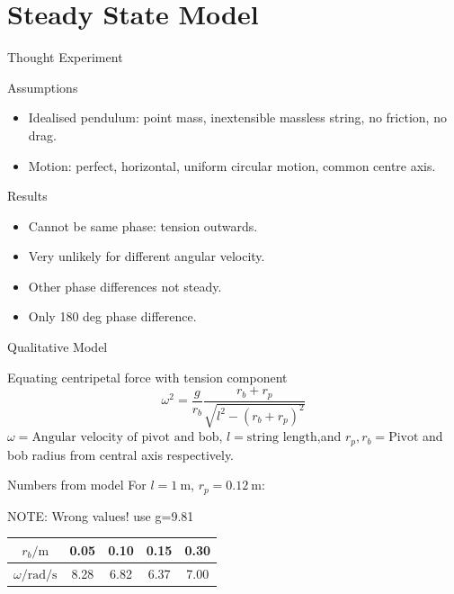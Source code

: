 \documentclass[10pt, compress]{beamer}
\begin{document}
\section{Steady State Model}

\begin{frame}{Thought Experiment}
    \begin{block}{Assumptions}
    \begin{itemize}
        \item Idealised pendulum: point mass, inextensible massless string, no friction, no drag.
        \item Motion: perfect, horizontal, uniform circular motion, common centre axis.
    \end{itemize}
    \end{block}
    \begin{block}{Results}
    \begin{itemize}
        \item Cannot be same phase: tension outwards.
        \item Very unlikely for different angular velocity.
        \item Other phase differences not steady.
        \item Only 180 deg phase difference.
    \end{itemize}
    \end{block}
\end{frame}

\begin{frame}{Qualitative Model}
    \begin{block}{Equating centripetal force with tension component}
        \begin{equation*}
            \omega^2 = \frac{g}{r_b} \frac{r_b+r_p}{\sqrt{l^2 - (r_b + r_p)^2}}
        \end{equation*}
        {\footnotesize $\omega=\text{Angular velocity of pivot and bob}$, $l = \text{string length}$,and $r_p,r_b=\text{Pivot}$ and bob radius from central axis respectively.}
    \end{block}
    \begin{block}{Numbers from model}
        For $l=\SI{1}{\metre}$, $r_p=\SI{0.12}{\metre}$:
        
        NOTE: Wrong values! use g=9.81
        \begin{center}
        \begin{tabular}{|c|c|c|c|c|}
            \hline
            $r_b / \si{\metre}$ & 0.05 & 0.10 & 0.15 & 0.30 \\
            \hline
            $\omega / \si{\radian\per\second}$ & 8.28 & 6.82 & 6.37 & 7.00 \\
            \hline
        \end{tabular}
        \end{center}
    \end{block}
\end{frame}
\end{document}
